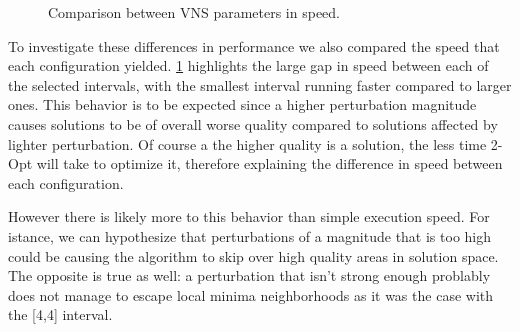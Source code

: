 \begin{figure}[htbp]
	\centering
	\caption{Comparison between VNS parameters in speed.} \label{fig:vnsIters}
\end{figure}

To investigate these differences in performance we also compared the speed that each configuration yielded.
\figurename{ \ref{fig:vnsIters}} highlights the large gap in speed between each of the selected intervals, with the smallest interval running faster compared to larger ones.
This behavior is to be expected since a higher perturbation magnitude causes solutions to be of overall worse quality compared to solutions affected by lighter perturbation.
Of course a the higher quality is a solution, the less time 2-Opt will take to optimize it, therefore explaining the difference in speed between each configuration.

However there is likely more to this behavior than simple execution speed.
For istance, we can hypothesize that perturbations of a magnitude that is too high could be causing the algorithm to skip over high quality areas in solution space.
The opposite is true as well: a perturbation that isn't strong enough problably does not manage to escape local minima neighborhoods as it was the case with the [4,4] interval.

